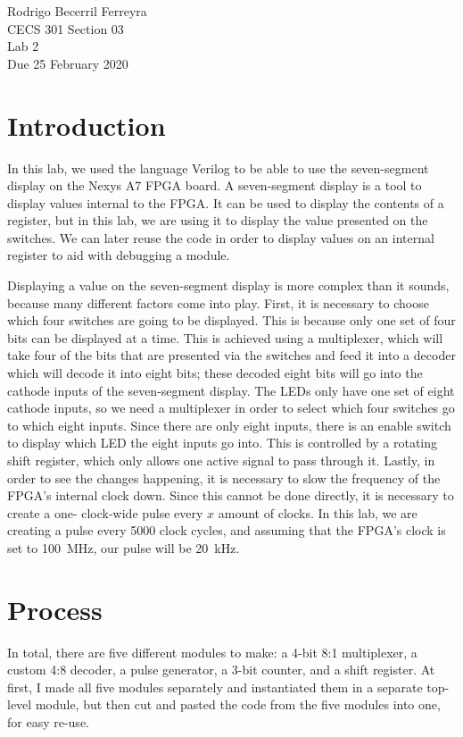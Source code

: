 \documentclass{article}
\begin{document}
\begin{flushright}
    \noindent
    Rodrigo Becerril Ferreyra\\
    CECS 301 Section 03\\
    Lab 2\\
    Due 25 February 2020
\end{flushright}

\section{Introduction} In this lab, we used the language Verilog
to be able to use the seven-segment display on the
Nexys A7 FPGA board. A seven-segment display is a tool
to display values internal to the FPGA. It can be used to
display the contents of a register, but in this lab, we are
using it to display the value presented on the switches.
We can later reuse the code in order to display values on
an internal register to aid with debugging a module.

Displaying a value on the seven-segment display is more complex
than it sounds, because many different factors come into play.
First, it is necessary to choose which four switches are going
to be displayed. This is because only one set of four bits
can be displayed at a time. This is achieved using
a multiplexer, which will
take four of the bits that are
presented via the switches and feed it into a decoder which
will decode it into eight bits; these decoded eight bits
will go into the cathode inputs of the seven-segment display.
The LEDs only have one set of eight cathode inputs, so we need
a multiplexer in order to select which four switches go to
which eight inputs. Since there are only eight inputs,
there
is an enable switch to display which LED the eight inputs go
into. This is controlled by a rotating shift register, which
only allows one active signal to pass through it. Lastly,
in order to see the changes happening, it is necessary to
slow the frequency of the FPGA's internal clock down. Since
this cannot be done directly, it is necessary to create a one-
clock-wide pulse every \(x\) amount of clocks. In this lab,
we are creating a pulse every \num{5000} clock cycles, and 
assuming that the FPGA's clock is set to \SI{100}{\mega\hertz},
our pulse will be \SI{20}{\kilo\hertz}.

\section{Process} In total, there are five different modules
to make: a 4-bit 8:1 multiplexer, a custom 4:8 decoder, a
pulse generator, a 3-bit counter, and a shift register. At
first, I made all five modules separately and instantiated
them in a separate top-level module, but then cut and pasted
the code from the five modules into one, for easy re-use.
\end{document}
